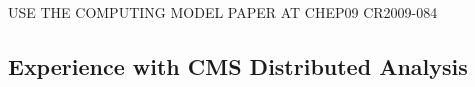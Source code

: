 USE THE COMPUTING MODEL PAPER AT CHEP09 CR2009-084

\subsection{Experience with CMS Distributed Analysis}
\label{sec:4_3}
